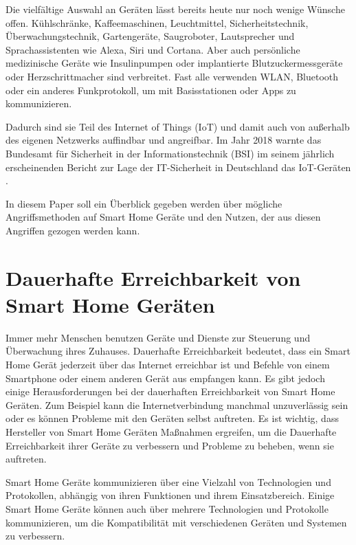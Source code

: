 \documentclass[12pt, a4paper, onecolumn, oneside, toc=bibliographynumbered, liststotoc]{scrreprt} %
\begin{document}
Die vielfältige Auswahl an Geräten lässt bereits heute nur noch wenige Wünsche offen. Kühlschränke, Kaffeemaschinen, Leuchtmittel, Sicherheitstechnik, Überwachungstechnik, Gartengeräte, Saugroboter, Lautsprecher und Sprachassistenten wie Alexa, Siri und Cortana. Aber auch persönliche medizinische Geräte wie Insulinpumpen oder implantierte Blutzuckermessgeräte oder Herzschrittmacher sind verbreitet. Fast alle verwenden WLAN, Bluetooth oder ein anderes Funkprotokoll, um mit Basisstationen oder Apps zu kommunizieren.

Dadurch sind sie Teil des Internet of Things (IoT) und damit auch von außerhalb des eigenen Netzwerks auffindbar und angreifbar. Im Jahr 2018 warnte das Bundesamt für Sicherheit in der Informationstechnik (BSI) im seinem jährlich erscheinenden Bericht zur Lage der IT-Sicherheit in Deutschland das IoT-Geräten .

In diesem Paper soll ein Überblick gegeben werden über mögliche Angriffsmethoden auf Smart Home Geräte und den Nutzen, der aus diesen Angriffen gezogen werden kann.

	\chapter{Dauerhafte Erreichbarkeit von Smart Home Geräten}
        Immer mehr Menschen benutzen Geräte und Dienste zur Steuerung und Überwachung ihres Zuhauses. Dauerhafte Erreichbarkeit bedeutet, dass ein Smart Home Gerät jederzeit über das Internet erreichbar ist und Befehle von einem Smartphone oder einem anderen Gerät aus empfangen kann. Es gibt jedoch einige Herausforderungen bei der dauerhaften Erreichbarkeit von Smart Home Geräten. Zum Beispiel kann die Internetverbindung manchmal unzuverlässig sein oder es können Probleme mit den Geräten selbst auftreten. Es ist wichtig, dass Hersteller von Smart Home Geräten Maßnahmen ergreifen, um die Dauerhafte Erreichbarkeit ihrer Geräte zu verbessern und Probleme zu beheben, wenn sie auftreten.
        
        Smart Home Geräte kommunizieren über eine Vielzahl von Technologien und Protokollen, abhängig von ihren Funktionen und ihrem Einsatzbereich. Einige Smart Home Geräte können auch über mehrere Technologien und Protokolle kommunizieren, um die Kompatibilität mit verschiedenen Geräten und Systemen zu verbessern. 
    
\end{document}
